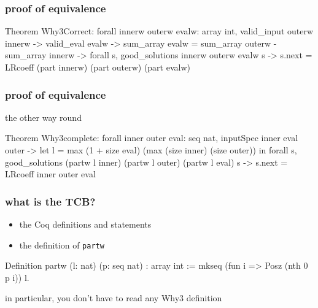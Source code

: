 \documentclass{beamer}
\let\emph\alert
\begin{document}
\begin{frame}[fragile]\frametitle{proof of equivalence}
\begin{coq}
Theorem Why3Correct:
  forall innerw outerw evalw: array int,
  valid_input outerw innerw ->
  valid_eval evalw ->
  sum_array evalw =
    sum_array outerw - sum_array innerw ->
  forall s, good_solutions innerw outerw evalw s ->
  s.next =
    LRcoeff (part innerw) (part outerw) (part evalw)
\end{coq}
\end{frame}

\begin{frame}[fragile]\frametitle{proof of equivalence}
the other way round
\bigskip
\begin{coq}
Theorem Why3complete:
  forall inner outer eval: seq nat,
  inputSpec inner eval outer ->
  let l = max (1 + size eval)
              (max (size inner) (size outer)) in
  forall s,
  good_solutions (partw l inner)
                 (partw l outer) (partw l eval) s ->
  s.next = LRcoeff inner outer eval
\end{coq}
\end{frame}

\begin{frame}[fragile]\frametitle{what is the TCB?}
  \begin{itemize}
  \item the Coq definitions and statements
  \item the definition of \texttt{partw}
  \end{itemize}
\begin{coq}
Definition partw (l: nat) (p: seq nat) : array int :=
  mkseq (fun i => Posz (nth 0 p i)) l.
\end{coq}

  \bigskip
  in particular, you don't have to read \emph{any} Why3 definition
\end{frame}

\end{document}
